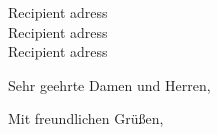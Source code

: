 

\longindentation=0pt


\begin{letter}{
        Recipient adress \\ 
        Recipient adress \\ 
        Recipient adress \\ 
    }
\opening{Sehr geehrte Damen und Herren,}

\closing{Mit freundlichen Grüßen,}

\end{letter}

